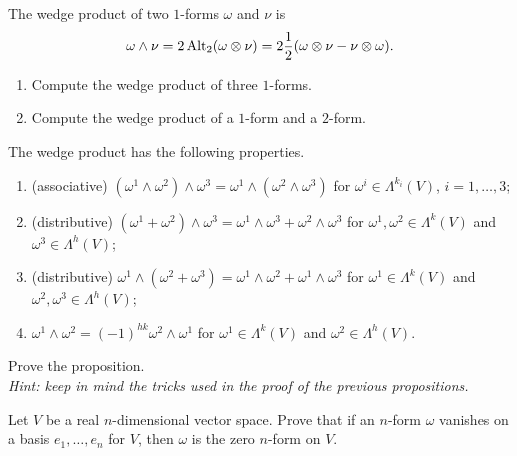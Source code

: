 \begin{example}
	The wedge product of two $1$-forms $\omega$ and $\nu$ is
	\begin{equation}
		\omega\wedge\nu = 2\operatorname{Alt}_2(\omega\otimes\nu) = 2 \frac12 (\omega \otimes \nu - \nu \otimes \omega).
	\end{equation}
\end{example}

\begin{exercise}
	\begin{enumerate}
		\item Compute the wedge product of three $1$-forms.
		\item Compute the wedge product of a $1$-form and a $2$-form.
	\end{enumerate}
\end{exercise}

\begin{proposition}
	The wedge product has the following properties.
	\begin{enumerate}
		\item (associative) $(\omega^1\wedge\omega^2)\wedge\omega^3 = \omega^1\wedge(\omega^2\wedge\omega^3)$ for $\omega^i\in\Lambda^{k_i}(V)$, $i=1,\ldots, 3$;
		\item (distributive) $(\omega^1+\omega^2)\wedge\omega^3 = \omega^1\wedge\omega^3+\omega^2\wedge\omega^3$ for $\omega^1,\omega^2\in\Lambda^{k}(V)$ and $\omega^3\in\Lambda^h(V)$;
		\item (distributive) $\omega^1\wedge(\omega^2+\omega^3) = \omega^1\wedge\omega^2+\omega^1\wedge\omega^3$ for $\omega^1\in\Lambda^{k}(V)$ and $\omega^2,\omega^3\in\Lambda^h(V)$;
		\item $\omega^1\wedge\omega^2 = {(-1)}^{hk}\omega^2\wedge\omega^1$ for $\omega^1\in\Lambda^{k}(V)$ and $\omega^2\in\Lambda^h(V)$.
	\end{enumerate}
\end{proposition}
\begin{exercise}
	Prove the proposition.\\
	\textit{\small Hint: keep in mind the tricks used in the proof of the previous propositions.}
\end{exercise}

\begin{exercise}\label{ex:zeroform}
	Let $V$ be a real $n$-dimensional vector space.
	Prove that if an $n$-form $\omega$ vanishes on a basis $e_1,\ldots,e_n$ for $V$, then $\omega$ is the zero $n$-form on $V$.
\end{exercise}


